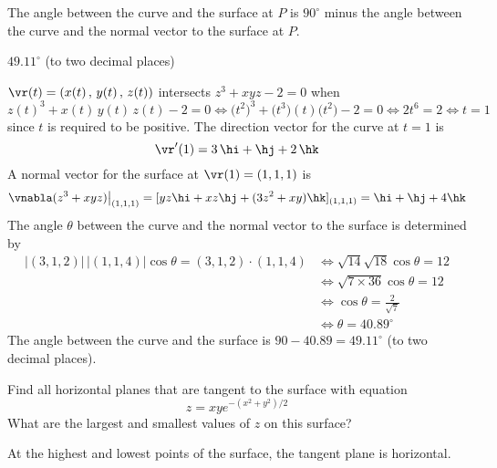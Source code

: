 \begin{hint}
 The angle between the curve and the surface at $P$ is $90^\circ$
minus the angle between the curve and the normal vector to the surface at $P$.
\end{hint}

\begin{answer}
$49.11^\circ$ (to two decimal places)
\end{answer}

\begin{solution}
$\vr(t)=( x(t)\,,\,y(t)\,,\,z(t))$ intersects $z^3 + xyz -2 = 0$ when
\begin{equation*}
z(t)^3+x(t)\,y(t)\,z(t)-2=0\iff \big(t^2\big)^3 + \big(t^3)(t)\big(t^2\big)-2=0
\iff 2t^6=2\iff t=1
\end{equation*}
since $t$ is required to be positive.
The direction vector for the curve at $t=1$ is
\begin{equation*}
\vr'(1)=3\,\hi+\hj+2\,\hk
\end{equation*}
A normal vector for the surface at $\vr(1)=( 1,1,1)$ is
\begin{equation*}
\vnabla(z^3+xyz)\big|_{(1,1,1)}=[yz\hi+xz\hj+(3z^2+xy)\hk]_{(1,1,1)}
=\hi+\hj+4\hk
\end{equation*}
The angle $\theta$ between the curve and the normal vector to the surface
is determined by
\begin{align*}
\big|( 3,1,2)\big|\,\big|( 1,1,4)\big|\cos\theta
             =( 3,1,2) \cdot( 1,1,4)
&\iff \sqrt{14}\sqrt{18}\cos\theta=12 \\
&\iff \sqrt{7\times 36}\cos\theta=12 \\
&\iff \cos\theta=\frac{2}{\sqrt{7}} \\
&\iff \theta=40.89^\circ
\end{align*}
The angle between the curve and the surface is 
$90-40.89=49.11^\circ$ (to two decimal places).
\end{solution}

\begin{question}
Find all horizontal planes that are tangent to the surface with equation
\begin{equation*}
z=xy e^{-(x^2+y^2)/2}
\end{equation*}
What are the largest and smallest values of $z$ on this surface?
\end{question}

\begin{hint}
At the highest and lowest points of the surface, the tangent plane is horizontal.
\end{hint}

